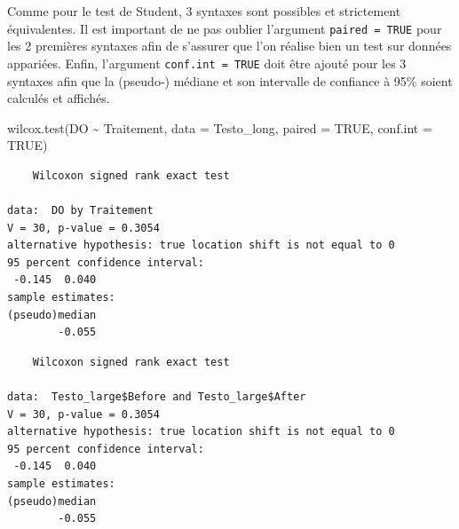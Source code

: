 \documentclass[
  a4paper,
]{article}
\newenvironment{Shaded}{\begin{snugshade}}{\end{snugshade}}
\newcommand{\AttributeTok}[1]{\textcolor[rgb]{0.00,0.34,0.68}{#1}}
\newcommand{\ConstantTok}[1]{\textcolor[rgb]{0.67,0.33,0.00}{#1}}
\newcommand{\DecValTok}[1]{\textcolor[rgb]{0.69,0.50,0.00}{#1}}
\newcommand{\FunctionTok}[1]{\textcolor[rgb]{0.39,0.29,0.61}{#1}}
\newcommand{\NormalTok}[1]{\textcolor[rgb]{0.12,0.11,0.11}{#1}}
\newcommand{\SpecialCharTok}[1]{\textcolor[rgb]{0.24,0.68,0.91}{#1}}
\begin{document}
Comme pour le test de Student, 3 syntaxes sont possibles et strictement équivalentes. Il est important de ne pas oublier l'argument \texttt{paired\ =\ TRUE} pour les 2 premières syntaxes afin de s'assurer que l'on réalise bien un test sur données appariées. Enfin, l'argument \texttt{conf.int\ =\ TRUE} doit être ajouté pour les 3 syntaxes afin que la (pseudo-) médiane et son intervalle de confiance à 95\% soient calculés et affichés.

\begin{Shaded}
\begin{Highlighting}[]
\FunctionTok{wilcox.test}\NormalTok{(DO }\SpecialCharTok{\textasciitilde{}}\NormalTok{ Traitement, }\AttributeTok{data =}\NormalTok{ Testo\_long, }\AttributeTok{paired =} \ConstantTok{TRUE}\NormalTok{, }\AttributeTok{conf.int =} \ConstantTok{TRUE}\NormalTok{)}
\end{Highlighting}
\end{Shaded}

\begin{verbatim}
    Wilcoxon signed rank exact test

data:  DO by Traitement
V = 30, p-value = 0.3054
alternative hypothesis: true location shift is not equal to 0
95 percent confidence interval:
 -0.145  0.040
sample estimates:
(pseudo)median 
        -0.055 
\end{verbatim}

\begin{Shaded}
\end{Shaded}

\begin{verbatim}
    Wilcoxon signed rank exact test

data:  Testo_large$Before and Testo_large$After
V = 30, p-value = 0.3054
alternative hypothesis: true location shift is not equal to 0
95 percent confidence interval:
 -0.145  0.040
sample estimates:
(pseudo)median 
        -0.055 
\end{verbatim}

\begin{Shaded}
\end{Shaded}
\end{document}
